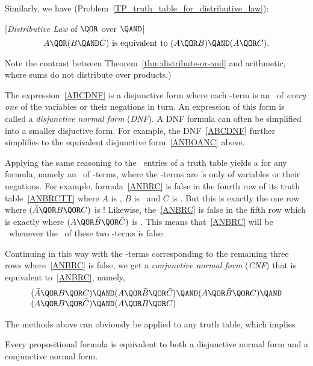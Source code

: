 Similarly, we have (Problem~\ref{TP_truth_table_for_distributive_law}):
\begin{theorem}\label{thm:distribute-or-and}[\emph{Distributive Law} of $\QOR$ over $\QAND$]
\[
A \QOR (B \QAND C)\text{ is equivalent to } (A \QOR B) \QAND (A \QOR
C).
\]
\end{theorem}%
Note the contrast between Theorem~\ref{thm:distribute-or-and} and
arithmetic, where sums do not distribute over products.)

The expression~\eqref{ABCDNF} is a disjunctive form where each
\QAND-term is an \QAND\ of \emph{every one} of the variables or their
negations in turn.  An expression of this form is called a
\emph{disjunctive normal form}%
%
(\emph{DNF}).  A DNF formula can often
be simplified into a smaller disjuctive form.  For example, the
DNF~\eqref{ABCDNF} further simplifies to the equivalent disjunctive
form~\eqref{ANBOANC} above.

Applying the same reasoning to the \false\ entries of a truth table
yields a  for any formula, namely an \QAND\
of \QOR-terms, where the \QOR-terms are \QOR's only of variables or
their negations.  For example, formula~\eqref{ANBRC} is false in the
fourth row of its truth table~\eqref{ANBRCTT} where $A$ is \true, $B$
is \false\ and $C$ is \false.  But this is exactly the one row where
$(\bar{A} \QOR B \QOR C)$ is \false!  Likewise, the~\eqref{ANBRC} is
false in the fifth row which is exactly where
$(A \QOR \bar{B} \QOR \bar{C})$ is \false.  This means
that~\eqref{ANBRC} will be \false\ whenever the \QAND\ of these
two \QOR-terms is false.  
\iffalse
$(\bar{A} \QOR B \QOR C) \QAND (A \QOR \bar{B} \QOR \bar{C})$ is \false.
\fi
Continuing in this way with the \QOR-terms corresponding to the
remaining three rows where~\eqref{ANBRC} is false, we get a
\emph{conjunctive normal form}%
(\emph{CNF})%
that is equivalent to~\eqref{ANBRC}, namely,
\[\begin{array}{l}
(\bar{A} \QOR B \QOR C)  \QAND (A \QOR \bar{B} \QOR \bar{C}) 
        \QAND (A \QOR \bar{B} \QOR C)  \QAND \\
(A \QOR B \QOR \bar{C}) \QAND (A \QOR B \QOR C)
\end{array}\]

The methods above can obviously be applied to any truth table, which implies
\begin{theorem}
Every propositional formula is equivalent to both a disjunctive normal
form and a conjunctive normal form.
\end{theorem}

